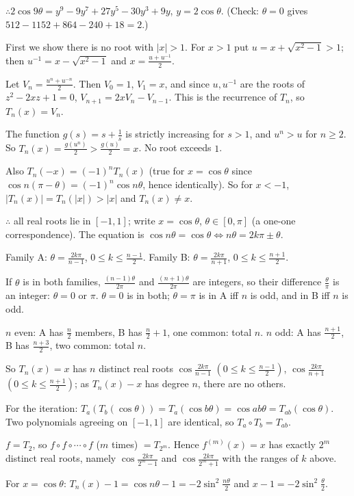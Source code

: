   $\therefore 2\cos9\theta = y^9 - 9y^7 + 27y^5 - 30y^3 + 9y$, $y = 2\cos\theta$. (Check: $\theta = 0$ gives $512 -
  1152 + 864 - 240 + 18 = 2$.)
\item First we show there is no root with $|x| > 1$. For $x > 1$ put $u = x + \sqrt{x^2 - 1} > 1$; then $u^{-1} = x -
  \sqrt{x^2 - 1}$ and $x = \frac{u + u^{-1}}{2}$.

  Let $V_n = \frac{u^n + u^{-n}}{2}$. Then $V_0 = 1$, $V_1 = x$, and since $u, u^{-1}$ are the roots of $z^2 - 2xz
  + 1 = 0$, $V_{n + 1} = 2xV_n - V_{n - 1}$. This is the recurrence of $T_n$, so $T_n(x) = V_n$.

  The function $g(s) = s + \frac{1}{s}$ is strictly increasing for $s > 1$, and $u^n > u$ for $n\geq 2$. So $T_n(x)
  = \frac{g(u^n)}{2} > \frac{g(u)}{2} = x$. No root exceeds $1$.

  Also $T_n(-x) = (-1)^nT_n(x)$ (true for $x = \cos\theta$ since $\cos n(\pi - \theta) = (-1)^n\cos n\theta$, hence
  identically). So for $x < -1$, $|T_n(x)| = T_n(|x|) > |x|$ and $T_n(x)\neq x$.

  $\therefore$ all real roots lie in $[-1, 1]$; write $x = \cos\theta$, $\theta\in[0, \pi]$ (a one-one
  correspondence). The equation is $\cos n\theta = \cos\theta\iff n\theta = 2k\pi\pm\theta$.

  Family A: $\theta = \frac{2k\pi}{n - 1}$, $0\leq k\leq\frac{n - 1}{2}$. Family B: $\theta = \frac{2k\pi}{n +
    1}$, $0\leq k\leq\frac{n + 1}{2}$.

  If $\theta$ is in both families, $\frac{(n - 1)\theta}{2\pi}$ and $\frac{(n + 1)\theta}{2\pi}$ are integers, so
  their difference $\frac{\theta}{\pi}$ is an integer: $\theta = 0$ or $\pi$. $\theta = 0$ is in both; $\theta =
  \pi$ is in A iff $n$ is odd, and in B iff $n$ is odd.

  $n$ even: A has $\frac{n}{2}$ members, B has $\frac{n}{2} + 1$, one common: total $n$. $n$ odd: A has $\frac{n +
    1}{2}$, B has $\frac{n + 3}{2}$, two common: total $n$.

  So $T_n(x) = x$ has $n$ distinct real roots $\cos\frac{2k\pi}{n - 1}$ $\left(0\leq k\leq\frac{n - 1}{2}\right)$,
  $\cos\frac{2k\pi}{n + 1}$ $\left(0\leq k\leq\frac{n + 1}{2}\right)$; as $T_n(x) - x$ has degree $n$, there are no
  others.

  For the iteration: $T_a(T_b(\cos\theta)) = T_a(\cos b\theta) = \cos ab\theta = T_{ab}(\cos\theta)$. Two
  polynomials agreeing on $[-1, 1]$ are identical, so $T_a\circ T_b = T_{ab}$.

  $f = T_2$, so $f\circ f\circ\cdots\circ f$ ($m$ times) $= T_{2^m}$. Hence $f^{(m)}(x) = x$ has exactly $2^m$
  distinct real roots, namely $\cos\frac{2k\pi}{2^m - 1}$ and $\cos\frac{2k\pi}{2^m + 1}$ with the ranges of $k$
  above.
\item For $x = \cos\theta$: $T_n(x) - 1 = \cos n\theta - 1 = -2\sin^2\frac{n\theta}{2}$ and $x - 1 =
  -2\sin^2\frac{\theta}{2}$.


